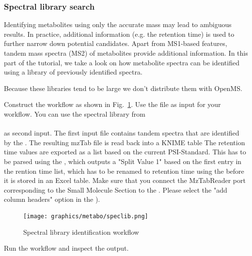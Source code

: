 \subsubsection{Spectral library search}

Identifying metabolites using only the accurate mass may lead to ambiguous results. In practice, additional information (e.g. the retention time) is used to further narrow down potential candidates. Apart from MS1-based features, tandem mass spectra (MS2) of metabolites provide additional information.
In this part of the tutorial, we take a look on how metabolite spectra can be identified using a library of previously identified spectra.

\noindent Because these libraries tend to be large we don't distribute them with OpenMS. 

\begin{task}
Construct the workflow as shown in Fig.~\ref{fig:speclib}.
Use the file  as input for your workflow.  You can use the spectral library from \\
\\ as second input. 
The first input file contains tandem spectra that are identified by the . The resulting mzTab file is read back into a KNIME table
The retention time values are exported as a list based on the current PSI-Standard. This has to be parsed using the , which outputs a "Split Value 1" based on the first entry in the rention time list, which has to be renamed to retention time using the  before it is stored in an Excel table. Make sure that you connect the MzTabReader port corresponding to the Small Molecule Section to the . Please select the "add column headers" option in the ).

\end{task}

\begin{figure}[htbp]
  \centering
  \texttt{[image: graphics/metabo/speclib.png]}
  \caption{Spectral library identification workflow}
  \label{fig:speclib}
\end{figure}

Run the workflow and inspect the output.

